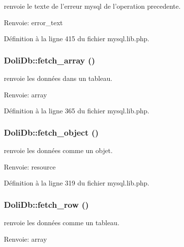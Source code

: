 renvoie le texte de l'erreur mysql de l'operation precedente. 

\begin{Desc}
\item[Renvoie:]error\_\-text \end{Desc}


D\'{e}finition \`{a} la ligne 415 du fichier mysql.lib.php.\hypertarget{classDoliDb_a18}{
\subsubsection[fetch\_\-array]{\setlength{\rightskip}{0pt plus 5cm}Doli\-Db::fetch\_\-array ()}}
\label{classDoliDb_a18}


renvoie les donn\'{e}es dans un tableau. 

\begin{Desc}
\item[Renvoie:]array \end{Desc}


D\'{e}finition \`{a} la ligne 365 du fichier mysql.lib.php.\hypertarget{classDoliDb_a14}{
\subsubsection[fetch\_\-object]{\setlength{\rightskip}{0pt plus 5cm}Doli\-Db::fetch\_\-object ()}}
\label{classDoliDb_a14}


renvoie les donn\'{e}es comme un objet. 

\begin{Desc}
\item[Renvoie:]resource \end{Desc}


D\'{e}finition \`{a} la ligne 319 du fichier mysql.lib.php.\hypertarget{classDoliDb_a19}{
\subsubsection[fetch\_\-row]{\setlength{\rightskip}{0pt plus 5cm}Doli\-Db::fetch\_\-row ()}}
\label{classDoliDb_a19}


renvoie les donn\'{e}es comme un tableau. 

\begin{Desc}
\item[Renvoie:]array \end{Desc}


